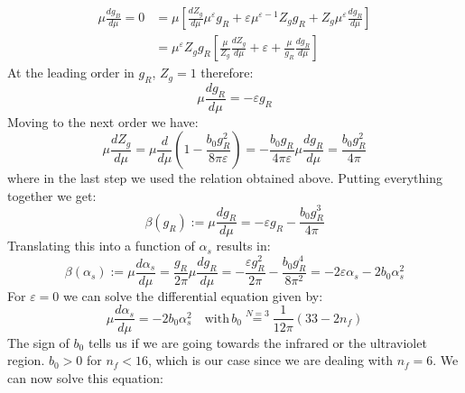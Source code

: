 \documentclass[../main.tex]{subfiles}
\begin{document}
\begin{align*}
\mu\frac{dg_B}{d\mu}=0&=\mu\left[\frac{dZ_g}{d\mu}\mu^\varepsilon g_R+\varepsilon\mu^{\varepsilon-1}Z_gg_R+Z_g\mu^\varepsilon\frac{dg_R}{d\mu}\right]\\
&=\mu^\varepsilon Z_gg_R\left[\frac{\mu}{Z_g}\frac{dZ_g}{d\mu}+\varepsilon+\frac{\mu}{g_R}\frac{dg_R}{d\mu}\right]
\end{align*}
At the leading order in $g_R$, $Z_g=1$ therefore:
\[
\mu\frac{dg_R}{d\mu}=-\varepsilon g_R
\]
Moving to the next order we have:
\[
\mu\frac{dZ_g}{d\mu}=\mu\frac{d}{d\mu}\left(1-\frac{b_0g_R^2}{8\pi\varepsilon}\right)=-\frac{b_0g_R}{4\pi\varepsilon}\mu\frac{dg_R}{d\mu}=\frac{b_0g_R^2}{4\pi}
\]
where in the last step we used the relation obtained above. Putting everything together we get:
\[
\beta(g_R):=\mu\frac{dg_R}{d\mu}=-\varepsilon g_R-\frac{b_0g_R^3}{4\pi}
\]
Translating this into a function of $\alpha_s$ results in:
\[
\beta(\alpha_s):=\mu\frac{d\alpha_s}{d\mu}=\frac{g_R}{2\pi}\mu\frac{dg_R}{d\mu}=-\frac{\varepsilon g_R^2}{2\pi}-\frac{b_0g_R^4}{8\pi^2}=-2\varepsilon\alpha_s-2b_0\alpha_s^2
\]
For $\varepsilon=0$ we can solve the differential equation given by:
\[
\mu\frac{d\alpha_s}{d\mu}=-2b_0\alpha_s^2 \quad \text{with}\,b_0\stackrel{N=3}{=}\frac{1}{12\pi}(33-2n_f)
\]
The sign of $b_0$ tells us if we are going towards the infrared or the ultraviolet region. $b_0>0$ for $n_f<16$, which is our case since we are dealing with $n_f=6$. We can now solve this equation:
\end{document}
